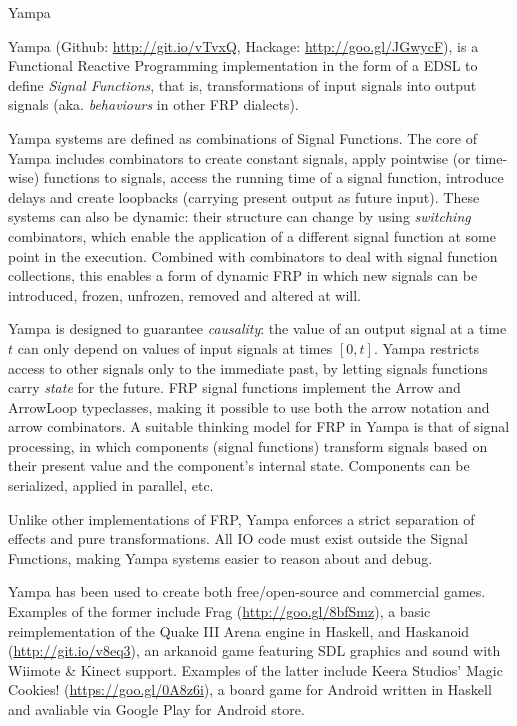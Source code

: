 \begin{hcarentry}[new]{Yampa}
\label{yampa}
\makeheader

Yampa (Github: \href{http://git.io/vTvxQ}{http://git.io/vTvxQ}, Hackage:
\href{http://goo.gl/JGwycF}{http://goo.gl/JGwycF}), is a Functional Reactive
Programming implementation in the form of a EDSL to define \emph{Signal
Functions}, that is, transformations of input signals into output signals (aka.
\emph{behaviours} in other FRP dialects). 

Yampa systems are defined as combinations of Signal Functions. The core of
Yampa includes combinators to create constant signals, apply  pointwise (or
time-wise) functions to signals, access the running time of a signal function,
introduce delays and create loopbacks (carrying present output as future
input). These systems can also be dynamic: their structure can change by using
\emph{switching} combinators, which enable the application of a different
signal function at some point in the execution. Combined with combinators to
deal with signal function collections, this enables a form of dynamic FRP in
which new signals can be introduced, frozen, unfrozen, removed and altered at
will.

Yampa is designed to guarantee \emph{causality}: the value of an output signal
at a time $t$ can only depend on values of input signals at times $[0,t]$.
Yampa restricts access to other signals only to the immediate past, by letting
signals functions carry \emph{state} for the future.  FRP signal functions
implement the Arrow and ArrowLoop typeclasses, making it possible to
use both the arrow notation and arrow combinators. A suitable thinking model
for FRP in Yampa is that of signal processing, in which components (signal
functions) transform signals based on their present value and the component's
internal state. Components can be serialized, applied in parallel, etc.

Unlike other implementations of FRP, Yampa enforces a strict separation of
effects and pure transformations. All IO code must exist outside the Signal
Functions, making Yampa systems easier to reason about and debug.

Yampa has been used to create both free/open-source and commercial games.
Examples of the former include Frag (\href{http://goo.gl/8bfSmz}{http://goo.gl/8bfSmz}), a basic
reimplementation of the Quake III Arena engine in Haskell, and Haskanoid
(\href{http://git.io/v8eq3}{http://git.io/v8eq3}), an arkanoid game featuring
SDL graphics and sound with Wiimote \& Kinect support. Examples of the latter
include Keera Studios' Magic Cookies!
(\href{https://goo.gl/0A8z6i}{https://goo.gl/0A8z6i}), a board game for Android
written in Haskell and avaliable via Google Play for Android store.


\end{hcarentry}

